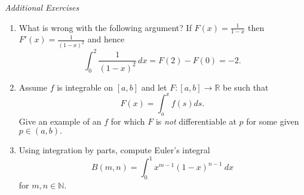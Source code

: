 \documentclass[openany, amssymb, psamsfonts]{amsart}
\newcommand{\bbR}{\mathbb{R}}
\theoremstyle{definition}
\numberwithin{equation}{section}
\begin{document}
\bigskip\newpage
\begin{center}
{\em Additional Exercises}
\end{center}

	
\begin{enumerate}



\item
	What is wrong with the following argument? If $F(x)=\frac{1}{1 - x}$ then $F'(x)=\frac{1}{(1 - x)^2}$ and hence
	\[
		\int_0^2 \frac{1}{(1 - x)^2}\,dx = F(2) - F(0) = -2.
	\]
	
\item Assume $f$ is integrable on $[a,b]$ and let $F:[a,b]\to \bbR$ be such that 
$$F(x)=\int_a^x f(s)ds.$$
Give an example of an $f$ for which $F$ is {\em not} differentiable at $p$ for some given $p\in (a,b).$

\item Using integration by parts, compute Euler's integral 
$$B(m,n)=\int_{0}^{1}x^{m-1}(1-x)^{n-1}\ dx$$
for $m, n\in \mathbb{N}.$



\end{enumerate}
\end{document}
